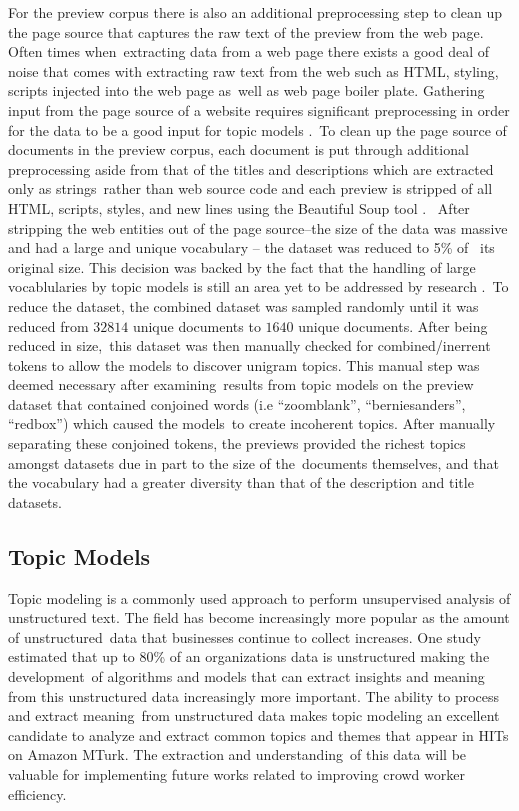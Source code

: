 \documentclass[letterpaper,12pt]{article}
\begin{document}
For the preview corpus there is also an additional preprocessing step to clean up the page source that captures the raw text of the preview from the web page. Often times when\
extracting data from a web page there exists a good deal of noise that comes with extracting raw text from the web such as HTML, styling, scripts injected into the web page as\
well as web page boiler plate. Gathering input from the page source of a website requires significant preprocessing in order for the data to be a good input for topic models \cite{boyd2014care}.\
To clean up the page source of documents in the preview corpus, each document is put through additional preprocessing aside from that of the titles and descriptions which are extracted only as strings\
rather than web source code and each preview is stripped of all HTML, scripts, styles, and new lines using the Beautiful Soup tool \cite{richardson2007beautiful}. \
After stripping the web entities out of the page source--the size of the data was massive and had a large and unique vocabulary -- the dataset was reduced to 5\% of \
its original size. This decision was backed by the fact that the handling of large vocablularies by topic models is still an area yet to be addressed by research \cite{dieng2019topic}.\
To reduce the dataset, the combined dataset was sampled randomly until it was reduced from $32814$ unique documents to $1640$ unique documents. After being reduced in size,\
this dataset was then manually checked for combined/inerrent tokens to allow the models to discover unigram topics. This manual step was deemed necessary after examining\
results from topic models on the preview dataset that contained conjoined words (i.e ``zoomblank'', ``berniesanders'', ``redbox'') which caused the models\
to create incoherent topics. After manually separating these conjoined tokens, the previews provided the richest topics amongst datasets due in part to the size of the\
documents themselves, and that the vocabulary had a greater diversity than that of the description and title datasets.
\subsection{Topic Models}
Topic modeling is a commonly used approach to perform unsupervised analysis of unstructured text. The field has become increasingly more popular as the amount of unstructured\
data that businesses continue to collect increases. One study estimated that up to 80\% of an organizations data is unstructured \cite{Sint2009CombiningUF} making the development\
of algorithms and models that can extract insights and meaning from this unstructured data increasingly more important. The ability to process and extract meaning\
from unstructured data makes topic modeling an excellent candidate to analyze and extract common topics and themes that appear in HITs on Amazon MTurk. The extraction and understanding\
of this data will be valuable for implementing future works related to improving crowd worker efficiency.
\end{document}
